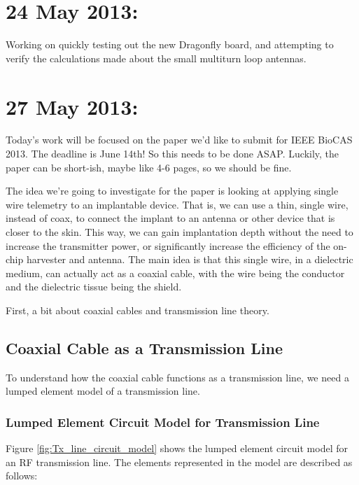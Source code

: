 \documentclass[12pt,onecolumn,titlepage]{article}
\begin{document}
\clearpage
\section{24 May 2013:}

\indent \indent Working on quickly testing out the new Dragonfly board, and attempting to verify the calculations made about the small multiturn loop antennas. 




\clearpage
\section{27 May 2013:}

\indent \indent Today's work will be focused on the paper we'd like to submit for IEEE BioCAS 2013. The deadline is June 14th! So this needs to be done ASAP. Luckily, the paper can be short-ish, maybe like 4-6 pages, so we should be fine.

The idea we're going to investigate for the paper is looking at applying single wire telemetry to an implantable device. That is, we can use a thin, single wire, instead of coax, to connect the implant to an antenna or other device that is closer to the skin. This way, we can gain implantation depth without the need to increase the transmitter power, or significantly increase the efficiency of the on-chip harvester and antenna. The main idea is that this single wire, in a dielectric medium, can actually act as a coaxial cable, with the wire being the conductor and the dielectric tissue being the shield. 

First, a bit about coaxial cables and transmission line theory.

\subsection{Coaxial Cable as a Transmission Line}
\indent \indent To understand how the coaxial cable functions as a transmission line, we need a lumped element model of a transmission line.

\subsubsection{Lumped Element Circuit Model for Transmission Line}
\indent \indent Figure \ref{fig:Tx_line_circuit_model} shows the lumped element circuit model for an RF transmission line. The elements represented in the model are described as follows:
\end{document}

